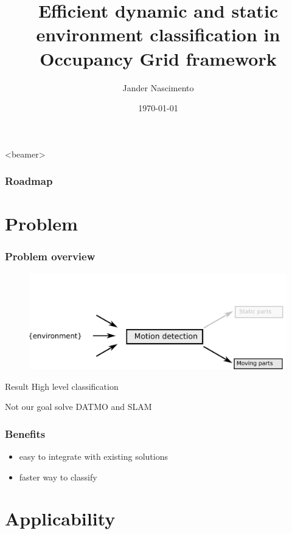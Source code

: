 \documentclass{beamer}
\title[Fast classification]{Efficient dynamic and static environment classification in Occupancy Grid framework}
\author{Jander Nascimento}
\institute{Université Joseph Fourier / INRIA}
\date{\today}
\begin{document}
\begin{frame}
\titlepage
\end{frame}

{
  \begin{frame}<beamer>
    \frametitle{Roadmap}
    \tableofcontents%
  \end{frame}
}

\section{Problem}

	\begin{frame}
		\frametitle{Problem overview}
		\begin{figure}[h]
			\center
			\includegraphics[scale=0.5]{img/fig:problem}
		 \end{figure}
		 
		\begin{block}{Result}
		High level classification
		\end{block}				 

		\begin{alertblock}{Not our goal}
			solve DATMO and SLAM
		\end{alertblock}
		 
	\end{frame}

	\begin{frame}
		\frametitle{Benefits}
		\begin{itemize}
		\item easy to integrate with existing solutions
		\item faster way to classify
		\end{itemize}
	\end{frame}

\section{Applicability}
\end{document}
